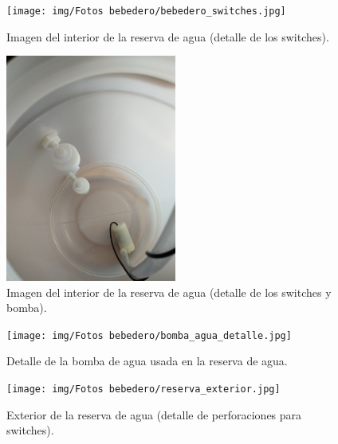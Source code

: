 \documentclass[12pt]{article}
\begin{document}
	\begin{figure}[h]
		\begin{center}
			\texttt{[image: img/Fotos bebedero/bebedero\_switches.jpg]}
			\caption{Imagen del interior de la reserva de agua (detalle de los switches).}
			\label{Prototipo: reserva agua (detalle interior solo switches)}
		\end{center}
	\end{figure}
	
	\pagebreak
	
	\begin{figure}[h]
		\begin{center}
			\includegraphics[width=0.5\textwidth]{img/Fotos bebedero/bebedero_switches_bomba.jpg}
			\caption{Imagen del interior de la reserva de agua (detalle de los switches y bomba).}
			\label{Prototipo: reserva agua (detalle interior)}
		\end{center}
	\end{figure}
	
	\pagebreak
	
	\begin{figure}[h]
		\begin{center}
			\texttt{[image: img/Fotos bebedero/bomba\_agua\_detalle.jpg]}
			\caption{Detalle de la bomba de agua usada en la reserva de agua.}
			\label{Prototipo: bomba agua (detalle)}
		\end{center}
	\end{figure}
	
	\pagebreak
	
	\begin{figure}[h]
		\begin{center}
			\texttt{[image: img/Fotos bebedero/reserva\_exterior.jpg]}
			\caption{Exterior de la reserva de agua (detalle de perforaciones para switches).}
			\label{Prototipo: reserva agua (detalle exterior)}
		\end{center}
	\end{figure}
	
\end{document}
